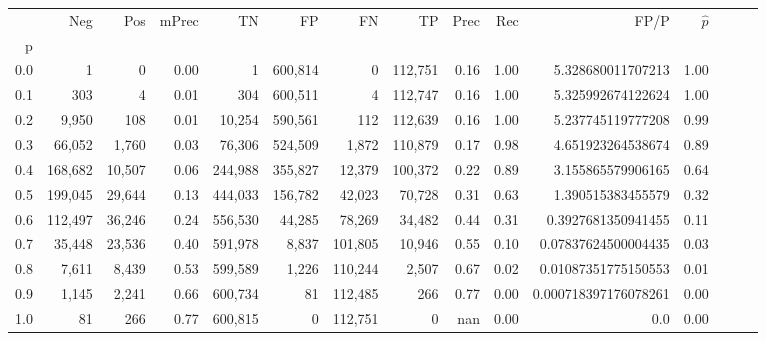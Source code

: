 \begin{tabular}{rrrrrrrrrrrrrrr}
\toprule
{} &      Neg &     Pos & mPrec &       TN &       FP &       FN &       TP &  Prec &   Rec &                  FP/P & $\hat{p}$ \\
p   &          &         &       &          &          &          &          &       &       &                       &           \\
\midrule
0.0 &        1 &       0 &  0.00 &        1 &  600,814 &        0 &  112,751 &  0.16 &  1.00 &     5.328680011707213 &      1.00 \\
0.1 &      303 &       4 &  0.01 &      304 &  600,511 &        4 &  112,747 &  0.16 &  1.00 &     5.325992674122624 &      1.00 \\
0.2 &    9,950 &     108 &  0.01 &   10,254 &  590,561 &      112 &  112,639 &  0.16 &  1.00 &     5.237745119777208 &      0.99 \\
0.3 &   66,052 &   1,760 &  0.03 &   76,306 &  524,509 &    1,872 &  110,879 &  0.17 &  0.98 &     4.651923264538674 &      0.89 \\
0.4 &  168,682 &  10,507 &  0.06 &  244,988 &  355,827 &   12,379 &  100,372 &  0.22 &  0.89 &     3.155865579906165 &      0.64 \\
0.5 &  199,045 &  29,644 &  0.13 &  444,033 &  156,782 &   42,023 &   70,728 &  0.31 &  0.63 &     1.390515383455579 &      0.32 \\
0.6 &  112,497 &  36,246 &  0.24 &  556,530 &   44,285 &   78,269 &   34,482 &  0.44 &  0.31 &    0.3927681350941455 &      0.11 \\
0.7 &   35,448 &  23,536 &  0.40 &  591,978 &    8,837 &  101,805 &   10,946 &  0.55 &  0.10 &   0.07837624500004435 &      0.03 \\
0.8 &    7,611 &   8,439 &  0.53 &  599,589 &    1,226 &  110,244 &    2,507 &  0.67 &  0.02 &   0.01087351775150553 &      0.01 \\
0.9 &    1,145 &   2,241 &  0.66 &  600,734 &       81 &  112,485 &      266 &  0.77 &  0.00 &  0.000718397176078261 &      0.00 \\
1.0 &       81 &     266 &  0.77 &  600,815 &        0 &  112,751 &        0 &   nan &  0.00 &                   0.0 &      0.00 \\
\bottomrule
\end{tabular}
